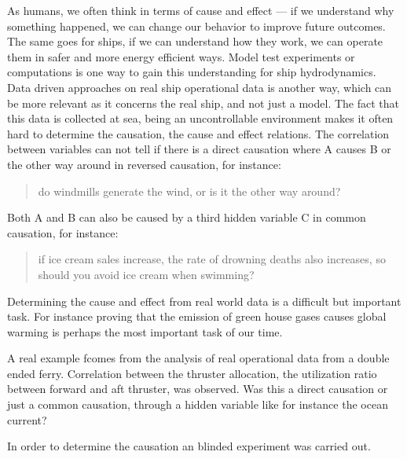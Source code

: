 As humans, we often think in terms of cause and effect — if we understand why something happened, we can change our behavior to improve future outcomes. The same goes for ships, if we can understand how they work, we can operate them in safer and more energy efficient ways. Model test experiments or computations is one way to gain this understanding for ship hydrodynamics. Data driven approaches on real ship operational data is another way, which can be more relevant as it concerns the real ship, and not just a model. The fact that this data is collected at sea, being an uncontrollable environment makes it often hard to determine the causation, the cause and effect relations. The correlation between variables can not tell if there is a direct causation where A causes B or the other way around in reversed causation, for instance:
\begin{quote}
do windmills generate the wind, or is it the other way around? 
\end{quote}

Both A and B can also be caused by a third hidden variable C in common causation, for instance:
\begin{quote}
if ice cream sales increase, the rate of drowning deaths also increases, so should you avoid ice cream when swimming? 
\end{quote}

Determining the cause and effect from real world data is a difficult but important task. For instance proving that the emission of green house gases causes global warming is perhaps the most important task of our time. 




A real example fcomes from the analysis of real operational data from a double ended ferry. Correlation between the thruster allocation, the utilization ratio between forward and aft thruster, was observed. Was this a direct causation or just a common causation, through a hidden variable like for instance the ocean current? 

In order to determine the causation an blinded experiment was carried out. 



